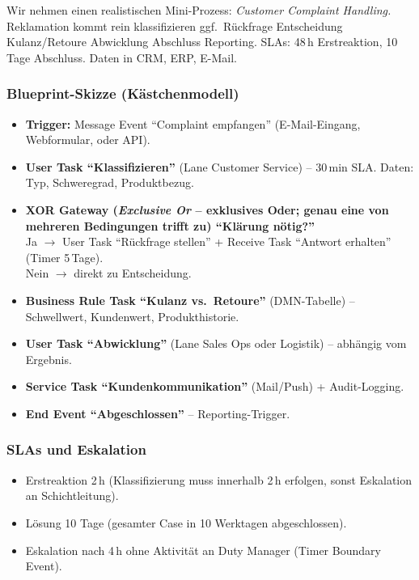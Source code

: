 \documentclass[11pt,a4paper,oneside]{article}
\begin{document}
Wir nehmen einen realistischen Mini-Prozess: \emph{Customer Complaint Handling.} Reklamation kommt rein \textrightarrow{} klassifizieren \textrightarrow{} ggf.\ Rückfrage \textrightarrow{} Entscheidung Kulanz/Retoure \textrightarrow{} Abwicklung \textrightarrow{} Abschluss \textrightarrow{} Reporting. SLAs: 48\,h Erstreaktion, 10 Tage Abschluss. Daten in CRM, ERP, E-Mail.

\subsubsection{Blueprint-Skizze (Kästchenmodell)}

\begin{itemize}
  \item \textbf{Trigger:} Message Event ``Complaint empfangen'' (E-Mail-Eingang, Webformular, oder API).
  \item \textbf{User Task ``Klassifizieren''} (Lane Customer Service) -- 30\,min SLA. Daten: Typ, Schweregrad, Produktbezug.
  \item \textbf{XOR Gateway (\emph{Exclusive Or} -- exklusives Oder; genau eine von mehreren Bedingungen trifft zu) ``Klärung nötig?''} \\
    Ja $\rightarrow$ User Task ``Rückfrage stellen'' + Receive Task ``Antwort erhalten'' (Timer 5\,Tage). \\
    Nein $\rightarrow$ direkt zu Entscheidung.
  \item \textbf{Business Rule Task ``Kulanz vs.\ Retoure''} (DMN-Tabelle) -- Schwellwert, Kundenwert, Produkthistorie.
  \item \textbf{User Task ``Abwicklung''} (Lane Sales Ops oder Logistik) -- abhängig vom Ergebnis.
  \item \textbf{Service Task ``Kundenkommunikation''} (Mail/Push) + Audit-Logging.
  \item \textbf{End Event ``Abgeschlossen''} -- Reporting-Trigger.
\end{itemize}

\subsubsection{SLAs und Eskalation}

\begin{itemize}
  \item Erstreaktion 2\,h (Klassifizierung muss innerhalb 2\,h erfolgen, sonst Eskalation an Schichtleitung).
  \item Lösung 10 Tage (gesamter Case in 10 Werktagen abgeschlossen).
  \item Eskalation nach 4\,h ohne Aktivität an Duty Manager (Timer Boundary Event).
\end{itemize}
\end{document}
